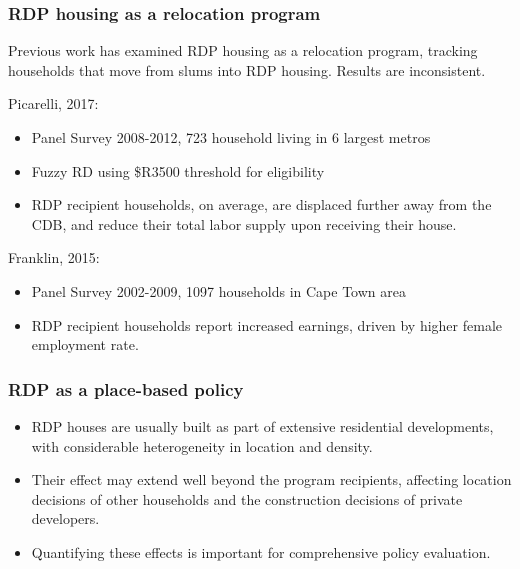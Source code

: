 \documentclass[aspectratio=149]{beamer}
\begin{document}

\begin{frame}
\frametitle{RDP housing as a relocation program }
Previous work has examined RDP housing as a relocation program, tracking households that move from slums into RDP housing. Results are inconsistent.

\vspace{.5em}

Picarelli, 2017:
  \begin{itemize}
    \item Panel Survey 2008-2012, 723 household living in 6 largest metros
    \item Fuzzy RD using \$R3500 threshold for eligibility   
    \item RDP recipient households, on average, are displaced further away from the CDB, and reduce their total labor supply upon receiving their house.
  \end{itemize}

  \vspace{.5em}

Franklin, 2015:
  \begin{itemize}
    \item Panel Survey 2002-2009, 1097 households in Cape Town area 
    \item RDP recipient households report increased earnings, driven by higher female employment rate.
  \end{itemize}




\end{frame}




\begin{frame}
\frametitle{RDP as a place-based policy}
  \begin{itemize}
    \item RDP houses are usually built as part of extensive residential developments, with considerable heterogeneity in location and density.
    \vspace{2mm}
    \item Their effect may extend well beyond the program recipients, affecting location decisions of other households and the construction decisions of private developers. 
    \vspace{2mm}
    \item Quantifying these effects is important for comprehensive policy evaluation.
  \end{itemize}

\end{frame}
\end{document}
